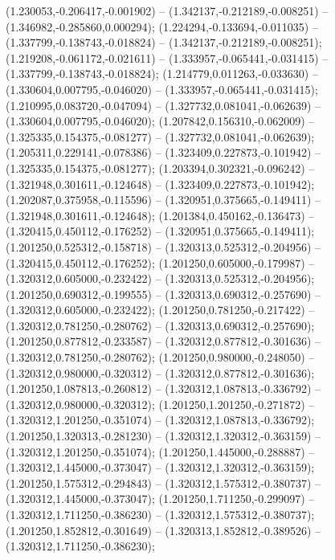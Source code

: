  (1.230053,-0.206417,-0.001902) -- (1.342137,-0.212189,-0.008251) -- (1.346982,-0.285860,0.000294);
 (1.224294,-0.133694,-0.011035) -- (1.337799,-0.138743,-0.018824) -- (1.342137,-0.212189,-0.008251);
 (1.219208,-0.061172,-0.021611) -- (1.333957,-0.065441,-0.031415) -- (1.337799,-0.138743,-0.018824);
 (1.214779,0.011263,-0.033630) -- (1.330604,0.007795,-0.046020) -- (1.333957,-0.065441,-0.031415);
 (1.210995,0.083720,-0.047094) -- (1.327732,0.081041,-0.062639) -- (1.330604,0.007795,-0.046020);
 (1.207842,0.156310,-0.062009) -- (1.325335,0.154375,-0.081277) -- (1.327732,0.081041,-0.062639);
 (1.205311,0.229141,-0.078386) -- (1.323409,0.227873,-0.101942) -- (1.325335,0.154375,-0.081277);
 (1.203394,0.302321,-0.096242) -- (1.321948,0.301611,-0.124648) -- (1.323409,0.227873,-0.101942);
 (1.202087,0.375958,-0.115596) -- (1.320951,0.375665,-0.149411) -- (1.321948,0.301611,-0.124648);
 (1.201384,0.450162,-0.136473) -- (1.320415,0.450112,-0.176252) -- (1.320951,0.375665,-0.149411);
 (1.201250,0.525312,-0.158718) -- (1.320313,0.525312,-0.204956) -- (1.320415,0.450112,-0.176252);
 (1.201250,0.605000,-0.179987) -- (1.320312,0.605000,-0.232422) -- (1.320313,0.525312,-0.204956);
 (1.201250,0.690312,-0.199555) -- (1.320313,0.690312,-0.257690) -- (1.320312,0.605000,-0.232422);
 (1.201250,0.781250,-0.217422) -- (1.320312,0.781250,-0.280762) -- (1.320313,0.690312,-0.257690);
 (1.201250,0.877812,-0.233587) -- (1.320312,0.877812,-0.301636) -- (1.320312,0.781250,-0.280762);
 (1.201250,0.980000,-0.248050) -- (1.320312,0.980000,-0.320312) -- (1.320312,0.877812,-0.301636);
 (1.201250,1.087813,-0.260812) -- (1.320312,1.087813,-0.336792) -- (1.320312,0.980000,-0.320312);
 (1.201250,1.201250,-0.271872) -- (1.320312,1.201250,-0.351074) -- (1.320312,1.087813,-0.336792);
 (1.201250,1.320313,-0.281230) -- (1.320312,1.320312,-0.363159) -- (1.320312,1.201250,-0.351074);
 (1.201250,1.445000,-0.288887) -- (1.320312,1.445000,-0.373047) -- (1.320312,1.320312,-0.363159);
 (1.201250,1.575312,-0.294843) -- (1.320312,1.575312,-0.380737) -- (1.320312,1.445000,-0.373047);
 (1.201250,1.711250,-0.299097) -- (1.320312,1.711250,-0.386230) -- (1.320312,1.575312,-0.380737);
 (1.201250,1.852812,-0.301649) -- (1.320313,1.852812,-0.389526) -- (1.320312,1.711250,-0.386230);
